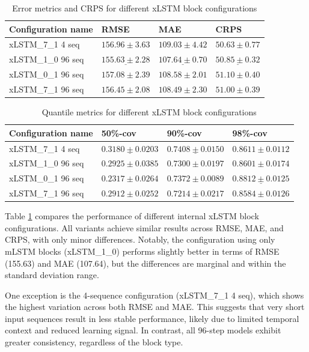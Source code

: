 \documentclass[class=scrbook, crop=false]{standalone}
\begin{document}
  \begin{table}[]
\centering
\begin{tabular}{l|l|l|l}
Configuration name 		&  RMSE 			 & MAE 			 & CRPS			\\\hline
xLSTM\_7\_1 4 seq	 	&$156.96\pm 3.63 	$&$ 109.03 \pm 4.42 	$&$50.63 \pm0.77	$\\
xLSTM\_1\_0 96 seq		&$\underline{155.63 \pm2.28}	$&$ \underline{107.64\pm0.70}	$& $\underline{50.85\pm0.32}	$\\
xLSTM\_0\_1 96 seq		&$ 157.08\pm2.39 	$&$ 108.58\pm2.01	$&$ 51.10\pm0.40	$\\
xLSTM\_7\_1 96 seq	 	&$156.45 \pm2.08	$&$ 108.49\pm2.30	$&$ 51.00\pm0.39 	$\\ 
\end{tabular}
\caption{Error metrics and CRPS for different xLSTM block configurations}
\label{Table::Performance_xLSTM}

\end{table}
\begin{table}
\centering
\begin{tabular}{l|l|l|l}
Configuration name 		& 50\%-cov 		& 90\%-cov 		& 98\%-cov \\\hline
xLSTM\_7\_1 4 seq	 	&$ \underline{0.3180 \pm0.0203}	$&$\underline{ 0.7408 \pm0.0150}	$&$ 0.8611 \pm0.0112	$\\
xLSTM\_1\_0 96 seq		&$ 0.2925 \pm0.0385	$&$ 0.7300 \pm0.0197	$&$ 0.8601\pm0.0174	$\\
xLSTM\_0\_1 96 seq		&$ 0.2317 \pm0.0264	$&$ 0.7372 \pm0.0089	$&$ \underline{0.8812 \pm0.0125}	$\\
xLSTM\_7\_1 96 seq	 	&$ 0.2912\pm0.0252	$&$ 0.7214 \pm0.0217	$&$ 0.8584 \pm0.0126	$\\ 
\end{tabular}
\caption{Quantile metrics for different xLSTM block configurations}
\label{Table::Performance_xLSTM_quantile}
\end{table}

Table \ref{Table::Performance_xLSTM} compares the performance of different internal xLSTM block configurations. All variants achieve similar results across RMSE, MAE, and CRPS, with only minor differences. Notably, the configuration using only mLSTM blocks (xLSTM\_1\_0) performs slightly better in terms of RMSE (155.63) and MAE (107.64), but the differences are marginal and within the standard deviation range.

One exception is the 4-sequence configuration (xLSTM\_7\_1 4 seq), which shows the highest variation across both RMSE and MAE. This suggests that very short input sequences result in less stable performance, likely due to limited temporal context and reduced learning signal. In contrast, all 96-step models exhibit greater consistency, regardless of the block type.
\end{document}
